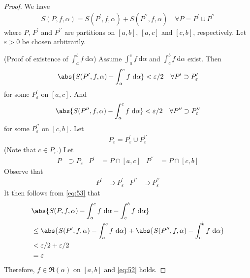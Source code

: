 \documentclass[thmcnt=section, 12pt]{elegantbook}
\begin{document}
\begin{proof}
    We have 
    \begin{align}
        S(P,f,\alpha) = S(P^\prime, f, \alpha) + S(P^{\prime\prime}, f, \alpha)
        \quad
        \forall P = P^\prime \cup P^{\prime\prime}
        \label{eq:53}
    \end{align}
    where $P$, $P^\prime$ and $P^{\prime\prime}$ are partitions on $[a, b]$, $[a, c]$ and $[c, b]$, respectively. Let $\varepsilon > 0$ be chosen arbitrarily.



    \par (Proof of existence of $\int_a^b f \ \mathrm{d}\alpha$) Assume $\int_a^c f \ \mathrm{d}\alpha$ and $\int_c^b f \ \mathrm{d}\alpha$ exist. Then 
    \begin{align*}
        \abs{S(P^\prime, f, \alpha) - \int_a^c f \ \mathrm{d}\alpha} < \varepsilon / 2
        \quad \forall P^\prime \supset P_\varepsilon^\prime
    \end{align*}
    for some $P_\varepsilon^\prime$ on $[a, c]$. And 
    \begin{align*}
        \abs{S(P^{\prime\prime}, f, \alpha) - \int_a^c f \ \mathrm{d}\alpha} < \varepsilon / 2
        \quad \forall P^{\prime\prime} \supset P_\varepsilon^{\prime\prime}
    \end{align*}
    for some $P_\varepsilon^{\prime\prime}$ on $[c, b]$. Let
    \begin{align*}
        P_\varepsilon = P_\varepsilon^\prime \cup P_\varepsilon^{\prime\prime}
    \end{align*}
    (Note that $c \in P_\varepsilon$.) Let
    \begin{align*}
        P &\supset P_\varepsilon &
        P^\prime &= P \cap [a, c] &
        P^{\prime\prime} &= P \cap [c, b]
    \end{align*}
    Observe that
    \begin{align*}
        P^\prime &\supset P_\varepsilon^\prime & 
        P^{\prime\prime} &\supset P_\varepsilon^{\prime\prime}
    \end{align*}
    It then follows from \eqref{eq:53} that
    \begin{align*}
        &\abs{
            S(P, f, \alpha)
            - \int_a^c f \ \mathrm{d}\alpha
            - \int_c^b f \ \mathrm{d}\alpha 
        } \\ 
        &\leq \abs{
            S(P^\prime, f, \alpha)
            - \int_a^c f \ \mathrm{d}\alpha
        } + \abs{
            S(P^{\prime\prime}, f, \alpha)
            - \int_c^b f \ \mathrm{d}\alpha
        } \\ 
        &< \varepsilon / 2 + \varepsilon / 2 \\ 
        &= \varepsilon
    \end{align*} 
    Therefore, $f \in \mathfrak{R}(\alpha)$ on $[a, b]$ and \eqref{eq:52} holds.




\end{proof}
\end{document}
